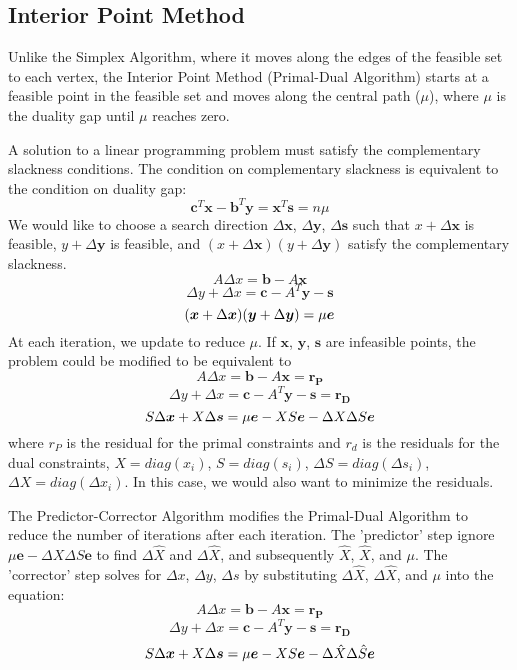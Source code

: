 \documentclass[11pt,reqno, a4]{amsart}
\begin{document}
\subsection{Interior Point Method}
Unlike the Simplex Algorithm, where it moves along the edges of the feasible set to each vertex, the Interior Point Method (Primal-Dual Algorithm) starts at a feasible point in the feasible set and moves along the central path ($\mu$), where $\mu$ is the duality gap until $\mu$ reaches zero.

A solution to a linear programming problem must satisfy the complementary slackness conditions. The condition on complementary slackness is equivalent to the condition on duality gap:
    $$
    \bm{c}^{T}\bm{x} - \bm{b}^{T}\bm{y} =\bm{x}^{T}\bm{s} = n\mu
    $$
We would like to choose a search direction $\Delta\bm{x}$, $\Delta\bm{y}$, $\Delta\bm{s}$ such that $x + \Delta\bm{x}$ is feasible, $y + \Delta\bm{y}$ is feasible, and $(x + \Delta\bm{x})(y + \Delta\bm{y})$ satisfy the complementary slackness.
    $$
    A\Delta{x} = \bm{b} - A\bm{x} 
    $$
    $$
    \Delta{y} + \Delta{x} = \bm{c} - A^{T}\bm{y} - \bm{s}
    $$
    $$
    (\bm{x} + \Delta\bm{x})(\bm{y} + \Delta\bm{y}) = \mu\bm{e} \\
    $$
At each iteration, we update to reduce $\mu$. 
If $\bm{x}$, $\bm{y}$, $\bm{s}$ are infeasible points, the problem could be modified to be equivalent to 
    $$
    A\Delta{x} = \bm{b} - A\bm{x} = \bm{r_{P}}
    $$
    $$
    \Delta{y} + \Delta{x} = \bm{c} - A^{T}\bm{y} - \bm{s} = \bm{r_{D}}
    $$
    $$
    S\Delta\bm{x} + X\Delta\bm{s} = \mu\bm{e} - XS\bm{e} - \Delta{X}\Delta{S}\bm{e}\\
    $$
where $r_{P}$ is the residual for the primal constraints and $r_{d}$ is the residuals for the dual constraints, $X = diag({x_{i}})$, $S = diag({s_{i}})$, $\Delta{S} = diag(\Delta{s_{i}})$, $\Delta{X} = diag(\Delta{x_{i}})$. In this case, we would also want to minimize the residuals. 

The Predictor-Corrector Algorithm modifies the Primal-Dual Algorithm to reduce the number of iterations after each iteration. The 'predictor' step ignore $\mu\bm{e} - \Delta{X}\Delta{S}\bm{e}$ to find $\Delta\hat{X}$ and $\Delta\hat{X}$, and subsequently $\hat{X}$, $\hat{X}$, and $\mu$. The 'corrector' step solves for $\Delta{x}$, $\Delta{y}$, $\Delta{s}$ by substituting $\Delta\hat{X}$, $\Delta\hat{X}$, and $\mu$ into the equation:
    $$
    A\Delta{x} = \bm{b} - A\bm{x} = \bm{r_{P}}
    $$
    $$
    \Delta{y} + \Delta{x} = \bm{c} - A^{T}\bm{y} - \bm{s} = \bm{r_{D}}
    $$
    $$
    S\Delta\bm{x} + X\Delta\bm{s} = \mu\bm{e} - XS\bm{e} - \Delta\hat{X}\Delta\hat{S}\bm{e}\\
    $$
\end{document}
